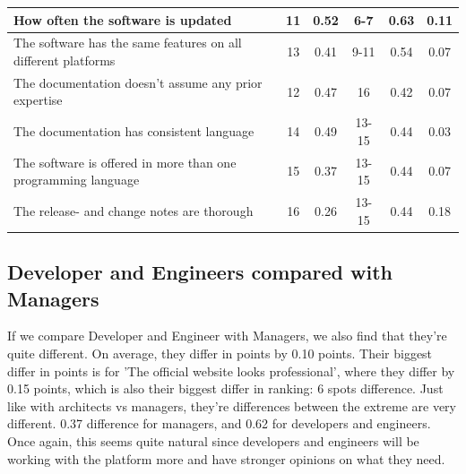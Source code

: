\documentclass{cslthse-msc}
\begin{document}
\begin{table}[H]
\begin{tabularx}{\columnwidth}{X|c:c|c:c|c}
            How often the software is updated                                     &        11 & 0.52       &          6-7 & 0.63           & 0.11  \\ \hline
            The software has the same features on all different platforms         &        13 & 0.41       &         9-11 & 0.54           & 0.07  \\ \hline
            The documentation doesn't assume any prior expertise                  &        12 & 0.47       &           16 & 0.42           & 0.07  \\ \hline
            The documentation has consistent language                             &        14 & 0.49       &        13-15 & 0.44           & 0.03  \\ \hline
            The software is offered in more than one programming language         &        15 & 0.37       &        13-15 & 0.44           & 0.07  \\ \hline
            The release- and change notes are thorough                            &        16 & 0.26       &        13-15 & 0.44           & 0.18  \\ \hline
        \end{tabularx}
    \end{table}

    \subsection{Developer and Engineers compared with Managers}
    If we compare Developer and Engineer with Managers, we also find that
    they're quite different. On average, they differ in points by 0.10
    points. Their biggest differ in points is for 'The official website
    looks professional', where they differ by 0.15 points, which is also
    their biggest differ in ranking: 6 spots difference. Just like with architects vs managers, they're differences between the extreme are very different. 0.37 difference for managers, and 0.62 for developers and engineers. Once again, this seems quite natural since developers and engineers will be working with the platform more and have stronger opinions on what they need.
\end{document}
